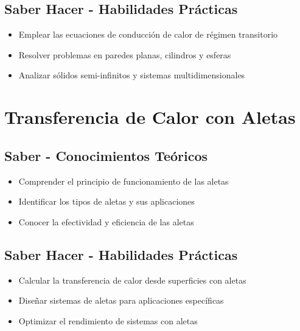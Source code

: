 \documentclass[12pt,a4paper,twoside]{book}
\begin{document}
	\subsection{Saber Hacer - Habilidades Prácticas}
	\begin{hacerbox}
		\begin{itemize}
			\item Emplear las ecuaciones de conducción de calor de régimen transitorio
			\item Resolver problemas en paredes planas, cilindros y esferas
			\item Analizar sólidos semi-infinitos y sistemas multidimensionales
		\end{itemize}
	\end{hacerbox}
	
	\section{Transferencia de Calor con Aletas}
	\label{sec:aletas}
	
	\subsection{Saber - Conocimientos Teóricos}
	\begin{saberbox}
		\begin{itemize}
			\item Comprender el principio de funcionamiento de las aletas
			\item Identificar los tipos de aletas y sus aplicaciones
			\item Conocer la efectividad y eficiencia de las aletas
		\end{itemize}
	\end{saberbox}
	
	\subsection{Saber Hacer - Habilidades Prácticas}
	\begin{hacerbox}
		\begin{itemize}
			\item Calcular la transferencia de calor desde superficies con aletas
			\item Diseñar sistemas de aletas para aplicaciones específicas
			\item Optimizar el rendimiento de sistemas con aletas
		\end{itemize}
	\end{hacerbox}
	
\end{document}
